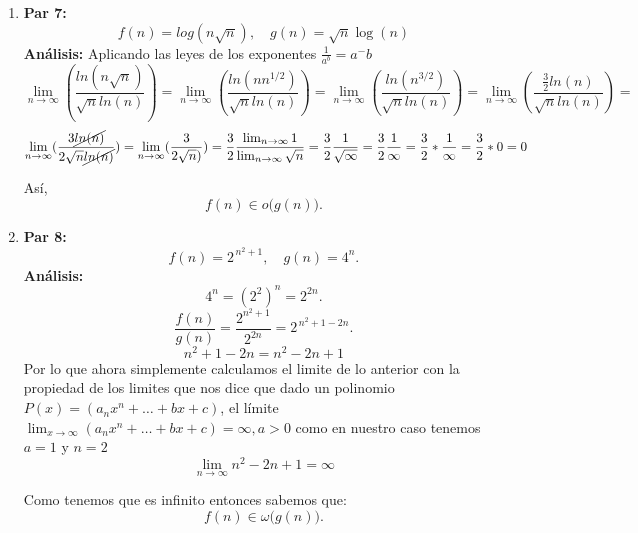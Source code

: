 \documentclass[12pt]{article}
\begin{document}
\begin{enumerate}
  \item \textbf{Par 7:}
  \[
    f(n) = log(n\sqrt{n}), \quad g(n) = \sqrt{n} \log(n)
  \]
  \textbf{Análisis:}
  Aplicando las leyes de los exponentes $\frac{1}{a^b}=a^-b$
  \[
  \lim_{n \to \infty}(\frac{ln(n\sqrt{n})}{\sqrt{n}ln(n)}) = \lim_{n \to \infty}(\frac{ln(nn^{1/2})}{\sqrt{n}ln(n)}) = \lim_{n \to \infty}(\frac{ln(n^{3/2})}{\sqrt{n}ln(n)})= \lim_{n \to \infty}(\frac{\frac{3}{2}ln(n)}{\sqrt{n}ln(n)}) = 
  \]
  \[
  \lim_{n \to \infty}(\frac{3\cancel{ln(n)}}{2\sqrt{n}\cancel{ln(n)}}) = \lim_{n \to \infty}(\frac{3}{2\sqrt{n})}) = \frac{3}{2} \frac{\lim_{n \to \infty} 1}{\lim_{n \to \infty}\sqrt{n}} = \frac{3}{2}\frac{1}{\sqrt{\infty}} =\frac{3}{2} \frac{1}{\infty} = \frac{3}{2}*\frac{1}{\infty} = \frac{3}{2}*0 = 0
  \]
  
  Así,
  \[
    f(n) \in o\bigl(g(n)\bigr).
  \]

  \item \textbf{Par 8:}
  \[
    f(n) = 2^{\,n^2 + 1}, \quad g(n) = 4^n.
  \]
  \textbf{Análisis:}
  \[
    4^n = (2^2)^n = 2^{2n}.
  \]
  \[
    \frac{f(n)}{g(n)} = \frac{2^{n^2+1}}{2^{2n}} = 2^{\,n^2 + 1 - 2n}.
  \]
  \[
    n^2 + 1 - 2n = n^2 - 2n + 1
  \]
  Por lo que ahora simplemente calculamos el limite de lo anterior con la propiedad de los limites que nos dice que dado un polinomio \( P(x) = (a_n x^n  + \dots + bx+c) \), el límite  \(\lim_{x \to \infty} (a_n x^n  + \dots + bx+c) = \infty, a>0\) como en nuestro caso tenemos $a=1$ y $n=2$ 
  \[
  \lim_{n \to \infty} n^2 - 2n + 1 = \infty
  \]
  
  Como tenemos que es infinito entonces sabemos que:
  \[
    f(n) \in \omega\bigl(g(n)\bigr).
  \]

\end{enumerate}
\end{document}
